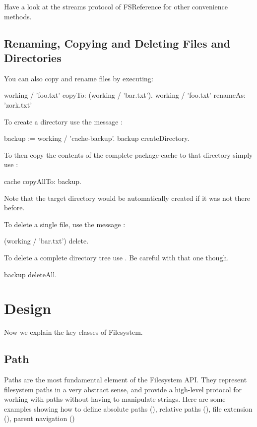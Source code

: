 \documentclass[a4paper,10pt,twoside]{book}
\begin{document}
Have a look at the streams protocol of FSReference for other convenience methods.

\subsection{Renaming, Copying and Deleting Files and Directories}

You can also copy and rename files by executing:

\begin{code}{}
working / 'foo.txt' copyTo: (working / 'bar.txt').
working / 'foo.txt' renameAs: 'zork.txt'
\end{code} 


To create a directory use the message :

\begin{code}{}
backup := working / 'cache-backup'.
backup createDirectory.
\end{code} 

To then copy the contents of the complete package-cache to that directory simply use :

\begin{code}{}
 cache copyAllTo: backup.
\end{code}

Note that the target directory would be automatically created if it was not there before.



To delete a single file, use the message :
\begin{code}{}
 (working / 'bar.txt') delete.
\end{code}

To delete a complete directory tree use . Be careful with that one though.

\begin{code}
backup deleteAll.
\end{code}


\section{Design }

Now we explain the key classes of Filesystem. 


\subsection{Path}
Paths are the most fundamental element of the Filesystem API. They represent filesystem paths in a very abstract sense, and provide a high-level protocol for working with paths without having to manipulate strings. Here are some examples showing how to 
define absolute paths (), relative paths (), file extension (), parent navigation ()
\end{document}
